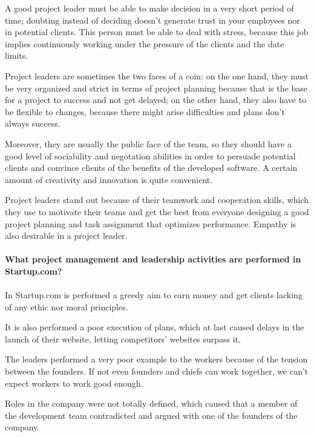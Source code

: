 \documentclass{article}
\begin{document}
A good project leader must be able to make decision in a very short period of time; doubting instead of deciding doesn't generate trust in your employees nor in potential clients. This person must be able to deal with stress, because this job implies continuously working under the pressure of the clients and the date limits. 

Project leaders are sometimes the two faces of a coin: on the one hand, they must be very organized and strict in terms of project planning because that is the base for a project to success and not get delayed; on the other hand, they also have to be flexible to changes, because there might arise difficulties and plans don't always success.

Moreover, they are usually the public face of the team, so they should have a good level of sociability and negotation abilities in order to persuade potential clients and convince clients of the benefits of the developed software. A certain amount of creativity and innovation is quite convenient.

Project leaders stand out because of their teamwork and cooperation skills, which they use to motivate their teams and get the best from everyone designing a good project planning and task assignment that optimizes performance. Empathy is also desirable in a project leader.


\paragraph{What project management and leadership activities are performed in Startup.com?}
\paragraph{}

In Startup.com is performed a greedy aim to earn money and get clients lacking of any ethic nor moral principles. 

It is also performed a poor execution of plans, which at last caused delays in the launch of their website, letting competitors' websites surpass it. 

The leaders performed a very poor example to the workers because of the tension between the founders. If not even founders and chiefs can work together, we can't expect workers to work good enough.

Roles in the company were not totally defined, which caused that a member of the development team contradicted and argued with one of the founders of the company.
\end{document}
